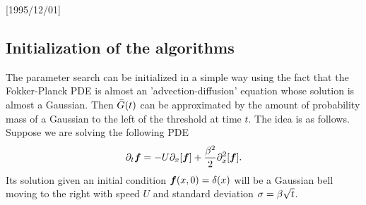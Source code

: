 \NeedsTeXFormat{LaTeX2e}[1995/12/01] \documentclass[10pt]{bmc_article}
\newenvironment{bmcformat}{\begin{raggedright}\baselineskip20pt\sloppy\setboolean{publ}{false}}{\end{raggedright}\baselineskip20pt\sloppy}
\begin{document}
\begin{bmcformat}
\subsection{Initialization of the algorithms}
The parameter search can be initialized in a simple way using the fact that
the Fokker-Planck PDE is almost an 'advection-diffusion' equation whose solution is
almost a Gaussian. Then ${ \bar{G} }(t)$ can be approximated by the
amount of probability mass of a Gaussian to the left of the threshold at time $t$. The
idea is as follows. Suppose we are solving the following PDE
\begin{equation}
{\partial}_t { \boldsymbol{f} } = -U {\partial}_x [{ \boldsymbol{f} }] + \frac{{\beta}^2}{2} {\partial}^2_x [{ \boldsymbol{f} }].
\label{eq:FP_pde}
\end{equation}
Its solution given an initial condition ${ \boldsymbol{f} }(x,0) = \delta(x)$ will be a 
Gaussian bell moving to the right with speed $U$ and standard deviation ${\sigma } =
{\beta}\sqrt{t}$.


\end{bmcformat}
\end{document}
